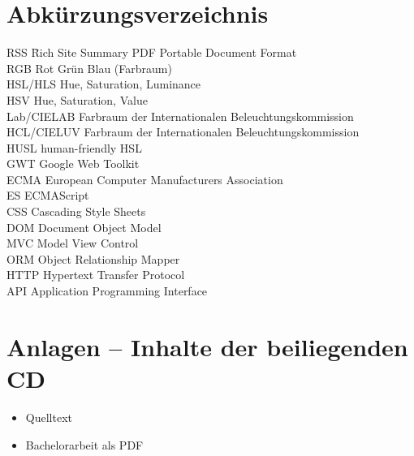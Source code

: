 \documentclass[12pt,twoside]{book}
\let\cleardoublepage\clearpage
\newcounter{savepage}
\begin{document}
\newpage

\setcounter{page}{\thesavepage}
\printbibliography
{}
\cleardoublepage

\listoffigures
{}
\cleardoublepage

\chapter*{Abkürzungsverzeichnis}

\begin{tabbing}
    RSS \hspace{3cm} \= Rich  Site Summary \kill
    PDF \> Portable Document Format \\
    RGB \> Rot Grün Blau  (Farbraum) \\
    HSL/HLS \> Hue, Saturation, Luminance \\
    HSV \> Hue, Saturation, Value \\
    Lab/CIELAB \> Farbraum der Internationalen Beleuchtungskommission \\
    HCL/CIELUV \> Farbraum der Internationalen Beleuchtungskommission \\
    HUSL \> human-friendly HSL \\
    GWT \> Google Web Toolkit \\
    ECMA \> European Computer Manufacturers Association \\
    ES \> ECMAScript \\
    CSS \> Cascading Style Sheets \\
    DOM \> Document Object Model \\
    MVC \> Model View Control \\
    ORM \> Object Relationship Mapper \\
    HTTP \> Hypertext Transfer Protocol \\
    API \> Application Programming Interface
\end{tabbing}
\cleardoublepage

\chapter*{Anlagen – Inhalte der beiliegenden CD}
\begin{itemize}
	\item Quelltext
	\item Bachelorarbeit als PDF
\end{itemize}
\end{document}
